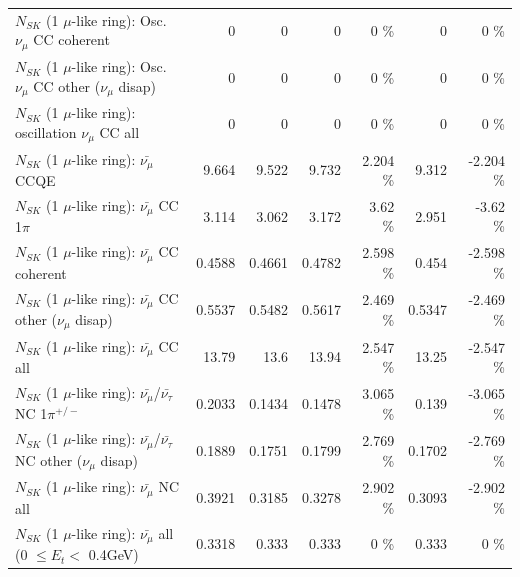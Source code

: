 \begin{table}
\begin{tabular}{| l | r | r | r  r | r  r |}
                        $N_{SK}$ (1 $\mu$-like ring): Osc. $\nu_\mu$ CC coherent &               0 &               0 &               0 &        0 \%  &               0 &        0 \%  \\ 
         $N_{SK}$ (1 $\mu$-like ring): Osc. $\nu_\mu$ CC other ($\nu_\mu$ disap) &               0 &               0 &               0 &        0 \%  &               0 &        0 \%  \\ 
                      $N_{SK}$ (1 $\mu$-like ring): oscillation $\nu_\mu$ CC all &               0 &               0 &               0 &        0 \%  &               0 &        0 \%  \\ 
\hline
\hline
                              $N_{SK}$ (1 $\mu$-like ring): $\bar{\nu_\mu}$ CCQE &           9.664 &           9.522 &           9.732 &    2.204 \%  &           9.312 &   -2.204 \%  \\ 
                         $N_{SK}$ (1 $\mu$-like ring): $\bar{\nu_\mu}$ CC 1$\pi$ &           3.114 &           3.062 &           3.172 &     3.62 \%  &           2.951 &    -3.62 \%  \\ 
                       $N_{SK}$ (1 $\mu$-like ring): $\bar{\nu_\mu}$ CC coherent &          0.4588 &          0.4661 &          0.4782 &    2.598 \%  &           0.454 &   -2.598 \%  \\ 
        $N_{SK}$ (1 $\mu$-like ring): $\bar{\nu_\mu}$ CC other ($\nu_\mu$ disap) &          0.5537 &          0.5482 &          0.5617 &    2.469 \%  &          0.5347 &   -2.469 \%  \\ 
                          $N_{SK}$ (1 $\mu$-like ring): $\bar{\nu_{\mu}}$ CC all &           13.79 &            13.6 &           13.94 &    2.547 \%  &           13.25 &   -2.547 \%  \\ 
\hline
  $N_{SK}$ (1 $\mu$-like ring): $\bar{\nu_\mu}$/$\bar{\nu_\tau}$ NC 1$\pi^{+/-}$ &          0.2033 &          0.1434 &          0.1478 &    3.065 \%  &           0.139 &   -3.065 \%  \\ 
$N_{SK}$ (1 $\mu$-like ring): $\bar{\nu_\mu}$/$\bar{\nu_\tau}$ NC other ($\nu_\mu$ disap) &          0.1889 &          0.1751 &          0.1799 &    2.769 \%  &          0.1702 &   -2.769 \%  \\ 
                          $N_{SK}$ (1 $\mu$-like ring): $\bar{\nu_{\mu}}$ NC all &          0.3921 &          0.3185 &          0.3278 &    2.902 \%  &          0.3093 &   -2.902 \%  \\ 
\hline
   $N_{SK}$ (1 $\mu$-like ring): $\bar{\nu_{\mu}}$ all (0 $\leq E_{t} <$ 0.4GeV) &          0.3318 &           0.333 &           0.333 &        0 \%  &           0.333 &        0 \%  \\ 

\end{tabular}
\end{table}

